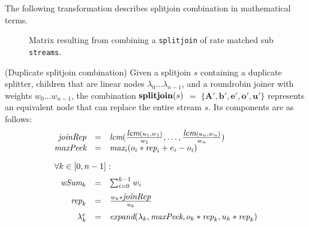 The following transformation describes splitjoin combination in
mathematical terms.


\begin{figure}
\center
\epsfxsize=3.0in
\caption{Matrix resulting from combining a {\tt splitjoin} of rate matched sub {\tt streams}.}
\label{fig:splitjoin-duplicate-matrix}
\end{figure}

\begin{transformation} (Duplicate splitjoin combination)
Given a splitjoin $s$ containing a duplicate splitter, children that
are linear nodes $\lambda_0 \dots \lambda_{n-1}$, and a roundrobin
joiner with weights $w_0 \dots w_{n-1}$, the combination $\mbox{\bf
splitjoin}(s)$ $=$ $\mathbf{ \{A', b', e', o', u'\}}$ represents an
equivalent node that can replace the entire stream $s$.  Its
components are as follows: \\
\begin{equation} \nonumber
\begin{array}{rcl}
\mt{joinRep} & = & \mt{lcm}(\frac{\mt{lcm}(u_1,w_1)}{w_1}, \dots, \frac{\mt{lcm}(u_n,w_n)}{w_n}) \\
\mt{maxPeek} & = & \mt{max}_i (o_i * \mt{rep}_i + e_i - o_i) \\ ~ \vspace{-2pt} \\
\multicolumn{3}{l}{\forall k \in [0, n-1]:} \\ ~ \vspace{-6pt} \\
\mt{wSum}_k & = & \sum_{i=0}^{k-1} w_i \\ ~ \vspace{-6pt} \\
\mt{rep}_k & = & \frac{w_k * \mt{joinRep}}{u_k} \\ ~ \vspace{-6pt} \\
\lambda_k^e & = & \mt{expand}(\lambda_k, \mt{maxPeek}, 
                              o_k * \mt{rep}_k, u_k * \mt{rep}_k) \\ ~ \vspace{-2pt} \\

\end{array}
\end{equation}
\end{transformation}

